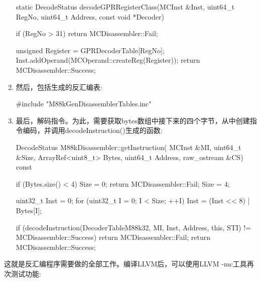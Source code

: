 \begin{enumerate}
\begin{cpp}
static DecodeStatus
decodeGPRRegisterClass(MCInst &Inst, uint64_t RegNo,
                        uint64_t Address,
                        const void *Decoder) {
    if (RegNo > 31)
        return MCDisassembler::Fail;

    unsigned Register = GPRDecoderTable[RegNo];
    Inst.addOperand(MCOperand::createReg(Register));
    return MCDisassembler::Success;
}
\end{cpp}

\item
然后，包括生成的反汇编表:

\begin{cpp}
#include "M88kGenDisassemblerTables.inc"
\end{cpp}

\item
最后，解码指令。为此，需要获取bytes数组中接下来的四个字节，从中创建指令编码，并调用decodeInstruction()生成的函数:

\begin{cpp}
DecodeStatus M88kDisassembler::getInstruction(
        MCInst &MI, uint64_t &Size, ArrayRef<uint8_t> Bytes,
        uint64_t Address, raw_ostream &CS) const {
    if (Bytes.size() < 4) {
        Size = 0;
        return MCDisassembler::Fail;
    }
    Size = 4;

    uint32_t Inst = 0;
    for (uint32_t I = 0; I < Size; ++I)
        Inst = (Inst << 8) | Bytes[I];

    if (decodeInstruction(DecoderTableM88k32, MI, Inst,
                          Address, this, STI) !=
        MCDisassembler::Success) {
        return MCDisassembler::Fail;
    }
    return MCDisassembler::Success;
}
\end{cpp}

\end{enumerate}

这就是反汇编程序需要做的全部工作。编译LLVM后，可以使用LLVM -mc工具再次测试功能:


